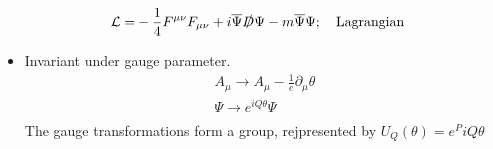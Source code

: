 \begin{itemize}
\begin{equation}
\begin{split}
        \mathcal{L}=&-\frac{1}{4}F^{\mu\nu}F_{\mu\nu}+i\overline{\Psi}\slashed{D}\Psi-m\overline{\Psi}\Psi; \quad\text{Lagrangian}
        \end{split}\end{equation}
        \item Invariant under gauge parameter. \cite{wells}
        \begin{equation}\begin{split}
        A_\mu\to A_\mu-\frac{1}{e}\partial_\mu\theta \\
        \Psi\to e^{iQ\theta}\Psi \\
        \end{split}\end{equation}
        The gauge transformations form a group, rejpresented by $U_Q(\theta)=e^P{iQ\theta}$
\end{itemize}

